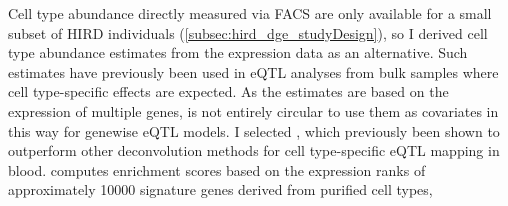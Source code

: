 Cell type abundance directly measured via \gls{FACS} are only available for a small subset of \gls{HIRD} individuals (\cref{subsec:hird_dge_studyDesign}), so I derived cell type abundance estimates from the expression data as an alternative.
Such estimates have previously been used in \gls{eQTL} analyses from bulk samples where cell type-specific effects are expected\autocite{westra2015CellSpecificEQTL,zhernakova2017IdentificationContextdependentExpression,davenport2018DiscoveringVivoCytokineeQTL,kim-hellmuth2020CellTypeSpecific}.
As the estimates are based on the expression of multiple genes, is not entirely circular to use them as covariates in this way for genewise \gls{eQTL} models.
%
%
%
I selected \autocite{aran2017XCellDigitallyPortraying}, which previously been shown to outperform other deconvolution methods for cell type-specific \gls{eQTL} mapping in blood\autocite{kim-hellmuth2020CellTypeSpecific}.
 computes enrichment scores based on the expression ranks of approximately 10000 signature genes derived from purified cell types,
